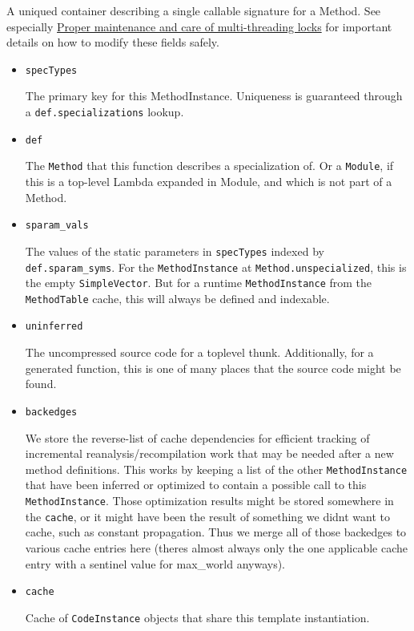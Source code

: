 A unique{\textquotesingle}d container describing a single callable signature for a Method. See especially \hyperlink{17047801949293328593}{Proper maintenance and care of multi-threading locks} for important details on how to modify these fields safely.



\begin{itemize}
\item \texttt{specTypes}

The primary key for this MethodInstance. Uniqueness is guaranteed through a \texttt{def.specializations} lookup.


\item \texttt{def}

The \texttt{Method} that this function describes a specialization of. Or a \texttt{Module}, if this is a top-level Lambda expanded in Module, and which is not part of a Method.


\item \texttt{sparam\_vals}

The values of the static parameters in \texttt{specTypes} indexed by \texttt{def.sparam\_syms}. For the \texttt{MethodInstance} at \texttt{Method.unspecialized}, this is the empty \texttt{SimpleVector}. But for a runtime \texttt{MethodInstance} from the \texttt{MethodTable} cache, this will always be defined and indexable.


\item \texttt{uninferred}

The uncompressed source code for a toplevel thunk. Additionally, for a generated function, this is one of many places that the source code might be found.


\item \texttt{backedges}

We store the reverse-list of cache dependencies for efficient tracking of incremental reanalysis/recompilation work that may be needed after a new method definitions. This works by keeping a list of the other \texttt{MethodInstance} that have been inferred or optimized to contain a possible call to this \texttt{MethodInstance}. Those optimization results might be stored somewhere in the \texttt{cache}, or it might have been the result of something we didn{\textquotesingle}t want to cache, such as constant propagation. Thus we merge all of those backedges to various cache entries here (there{\textquotesingle}s almost always only the one applicable cache entry with a sentinel value for max\_world anyways).


\item \texttt{cache}

Cache of \texttt{CodeInstance} objects that share this template instantiation.

\end{itemize}



